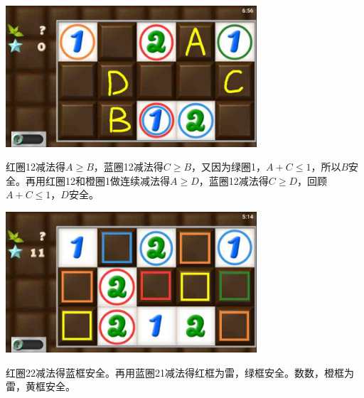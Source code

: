 \subsection{} %
\begin{center}
    \includegraphics[width=0.7\textwidth]{puzzlelow/78-1.jpg}
\end{center}
红圈12减法得$A\ge B$，蓝圈12减法得$C\ge B$，又因为绿圈1，$A+C\le 1$，所以$B$安全。再用红圈12和橙圈1做连续减法得$A\ge D$，蓝圈12减法得$C\ge D$，回顾$A+C\le 1$，$D$安全。
\begin{center}
    \includegraphics[width=0.7\textwidth]{puzzlelow/78-2.jpg}
\end{center}
红圈22减法得蓝框安全。再用蓝圈21减法得红框为雷，绿框安全。数数，橙框为雷，黄框安全。

